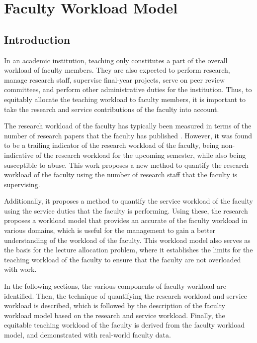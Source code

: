 \chapter{Faculty Workload Model}

\section{Introduction}

In an academic institution, teaching only constitutes a part of the overall workload of faculty members. They are also expected to perform research, manage research staff, supervise final-year projects, serve on peer review committees, and perform other administrative duties for the institution. Thus, to equitably allocate the teaching workload to faculty members, it is important to take the research and service contributions of the faculty into account.

The research workload of the faculty has typically been measured in terms of the number of research papers that the faculty has published \cite{finlay1994management, narasimhan32trase}. However, it was found to be a trailing indicator of the research workload of the faculty, being non-indicative of the research workload for the upcoming semester, while also being susceptible to abuse. This work proposes a new method to quantify the research workload of the faculty using the number of research staff that the faculty is supervising.

Additionally, it proposes a method to quantify the service workload of the faculty using the service duties that the faculty is performing. Using these, the research proposes a workload model that provides an accurate of the faculty workload in various domains, which is useful for the management to gain a better understanding of the workload of the faculty. This workload model also serves as the basis for the lecture allocation problem, where it establishes the limits for the teaching workload of the faculty to ensure that the faculty are not overloaded with work.

In the following sections, the various components of faculty workload are identified. Then, the technique of quantifying the research workload and service workload is described, which is followed by the description of the faculty workload model based on the research and service workload. Finally, the equitable teaching workload of the faculty is derived from the faculty workload model, and demonstrated with real-world faculty data.

